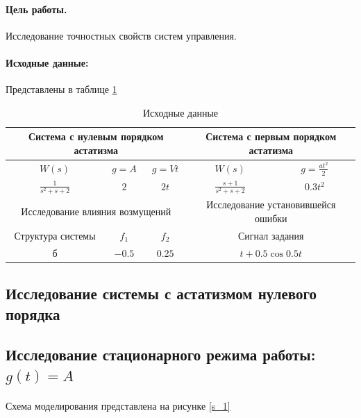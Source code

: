 \documentclass[a4paper,12pt]{article}
\begin{document}
	
	\paragraph{Цель работы.} Исследование точностных свойств систем управления.
	
	\paragraph {Исходные данные:} Представлены в таблице \ref{t_1}
	
	\begin{table}[h]
		\caption{Исходные данные}
		\renewcommand{\arraystretch}{2} 
		\begin{center}
			\begin{tabular}{|c|c|c|c|c|}
				\hline
				\multicolumn{3}{|c|}{Система с нулевым порядком астатизма} & \multicolumn{2}{|c|}{Система с первым порядком астатизма} \\ \hline
				$W(s)$ & $g=A$ & $g=Vt$ & $W(s)$ & $g=\frac{at^2}{2}$ \\ \hline
				$\frac{1}{s^2+s+2}$ & $2$ & $2t$ & $\frac{s+1}{s^2+s+2}$ & $0.3t^2$ \\ \hline
				\multicolumn{3}{|c|}{Исследование влияния возмущений} & \multicolumn{2}{c|}{Исследование установившейся ошибки} \\ \hline
				Структура системы & $f_1$ & $f_2$ & \multicolumn{2}{c|}{Сигнал задания} \\ \hline
				б & $-0.5$ & $0.25$ & \multicolumn{2}{c|}{$t+0.5\cos0.5t$} \\ \hline
			\end{tabular}
		\end{center}
		\label{t_1}
	\end{table}
	\newpage
	\begin{center}
		\section{Исследование системы с астатизмом нулевого порядка}
	\end{center}
	\subsection{Исследование стационарного режима работы: $g(t)=A$}
	
	\paragraph {} Схема моделирования представлена на рисунке \ref{s_1}
	
\end{document}
